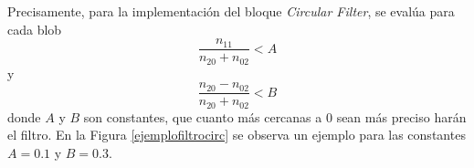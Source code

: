 Precisamente, para la implementación del bloque \emph{Circular Filter}, se evalúa para cada blob $$\frac{n_{11}}{n_{20}+n_{02}}< A$$ y $$\frac{n_{20}-n_{02}}{n_{20}+n_{02}}< B$$ donde $A$ y $B$ son constantes, que cuanto más cercanas a $0$ sean más preciso harán el filtro. En la Figura \ref{ejemplofiltrocirc} se observa un ejemplo para las constantes $A = 0.1$ y $B = 0.3$.

\begin{figure}[H]
        \centering
        \hspace{5 mm}

\end{figure}
